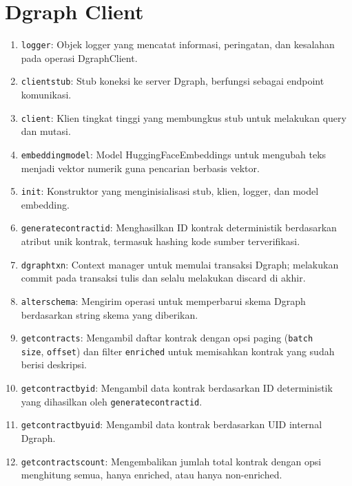 \chapter{Dgraph Client}
\label{appendix:dgraph-client}

\begin{enumerate}
	\item \texttt{logger}: Objek logger yang mencatat informasi, peringatan, dan kesalahan pada operasi DgraphClient.
	\item \texttt{client\textunderscore stub}: Stub koneksi ke server Dgraph, berfungsi sebagai endpoint komunikasi.
	\item \texttt{client}: Klien tingkat tinggi yang membungkus stub untuk melakukan query dan mutasi.
	\item \texttt{embedding\textunderscore model}: Model HuggingFaceEmbeddings untuk mengubah teks menjadi vektor numerik guna pencarian berbasis vektor.
	\item \texttt{\textunderscore init\textunderscore }: Konstruktor yang menginisialisasi stub, klien, logger, dan model embedding.
	\item \texttt{generate\textunderscore contract\textunderscore id}: Menghasilkan ID kontrak deterministik berdasarkan atribut unik kontrak, termasuk hashing kode sumber terverifikasi.
	\item \texttt{dgraph\textunderscore txn}: Context manager untuk memulai transaksi Dgraph; melakukan commit pada transaksi tulis dan selalu melakukan discard di akhir.
	\item \texttt{alter\textunderscore schema}: Mengirim operasi untuk memperbarui skema Dgraph berdasarkan string skema yang diberikan.
	\item \texttt{get\textunderscore contracts}: Mengambil daftar kontrak dengan opsi paging (\texttt{batch\textunderscore \\size}, \texttt{offset}) dan filter \texttt{enriched} untuk memisahkan kontrak yang sudah berisi deskripsi.
	\item \texttt{get\textunderscore contract\textunderscore by\textunderscore id}: Mengambil data kontrak berdasarkan ID deterministik yang dihasilkan oleh \texttt{generate\textunderscore contract\textunderscore id}.
	\item \texttt{get\textunderscore contract\textunderscore by\textunderscore uid}: Mengambil data kontrak berdasarkan UID internal Dgraph.
	\item \texttt{get\textunderscore contracts\textunderscore count}: Mengembalikan jumlah total kontrak dengan opsi menghitung semua, hanya enriched, atau hanya non-enriched.

\end{enumerate}
